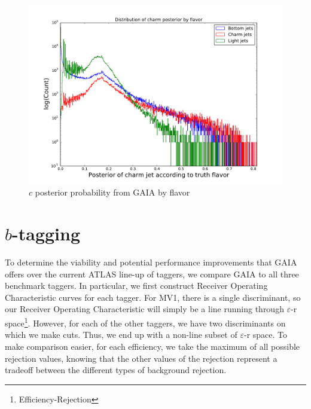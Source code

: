 \begin{figure}[h]
\includegraphics[width=\textwidth]{figures/charm_p_distro}
\caption[The ATLAS detector]{$c$ posterior probability from GAIA by flavor
\label{fig:cpost}}
\end{figure}



\section{$b$-tagging} 
\label{sec:btag}

\newcommand{\roc}{Receiver Operating Characteristic }
\newcommand{\er}{$\varepsilon$-r }

To determine the viability and potential performance improvements that GAIA offers over the current ATLAS line-up of taggers, we compare GAIA to all three benchmark taggers. In particular, we first construct \roc curves for each tagger. For MV1, there is a single discriminant, so our \roc will simply be a line running through \er space\footnote{Efficiency-Rejection}. However, for each of the other taggers, we have two discriminants on which we make cuts. Thus, we end up with a non-line subset of \er space. To make comparison easier, for each efficiency, we take the maximum of all possible rejection values, knowing that the other values of the rejection represent a tradeoff between the different types of background rejection.


